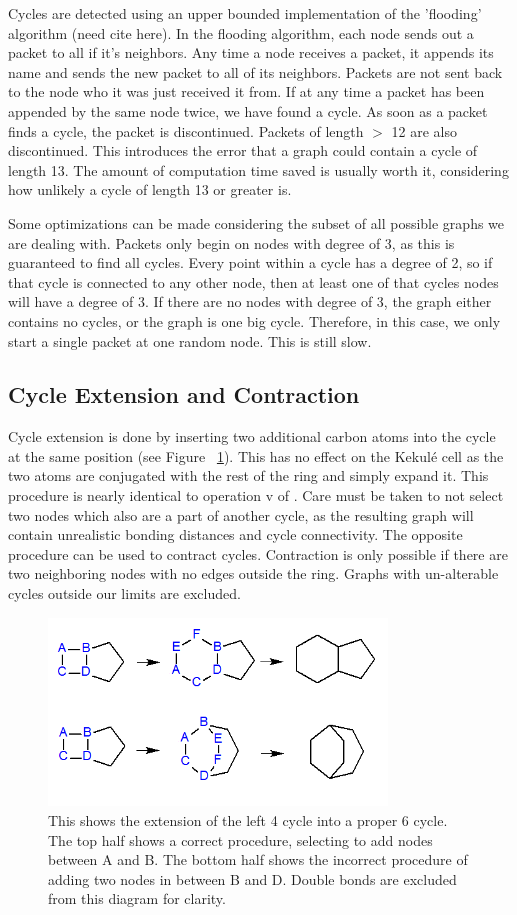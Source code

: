 \documentclass[12pt]{article}
\begin{document}
Cycles are detected using an upper bounded implementation of the 'flooding' algorithm (need cite here). In the flooding algorithm, each node sends out a packet to all if it's neighbors. Any time a node receives a packet, it appends its name and sends the new packet to all of its neighbors. Packets are not sent back to the node who it was just received it from. If at any time a packet has been appended by the same node twice, we have found a cycle. As soon as a packet finds a cycle, the packet is discontinued. Packets of length $>$ 12 are also discontinued. This introduces the error that a graph could contain a cycle of length 13. The amount of computation time saved is usually worth it, considering how unlikely a cycle of length 13 or greater is. 

Some optimizations can be made considering the subset of all possible graphs we are dealing with. Packets only begin on nodes with degree of 3, as this is guaranteed to find all cycles. Every point within a cycle has a degree of 2, so if that cycle is connected to any other node, then at least one of that cycles nodes will have a degree of 3. If there are no nodes with degree of 3, the graph either contains no cycles, or the graph is one big cycle. Therefore, in this case, we only start a single packet at one random node. This is still slow.

\subsection{Cycle Extension and Contraction}
Cycle extension is done by inserting two additional carbon atoms into the cycle at the same position (see Figure ~\ref{fig:cycleExtension}). This has no effect on the Kekul\'e cell as the two atoms are conjugated with the rest of the ring and simply expand it. This procedure is nearly identical to operation v of \cite{v06}. Care must be taken to not select two nodes which also are a part of another cycle, as the resulting graph will contain unrealistic bonding distances and cycle connectivity. The opposite procedure can be used to contract cycles. Contraction is only possible if there are two neighboring nodes with no edges outside the ring. Graphs with un-alterable cycles outside our limits are excluded.

\begin{figure}[ht!]
\centering
\includegraphics[width=90mm]{cycleExtension.png}
\caption{This shows the extension of the left 4 cycle into a proper 6 cycle. The top half shows a correct procedure, selecting to add nodes between A and B. The bottom half shows the incorrect procedure of adding two nodes in between B and D. Double bonds are excluded from this diagram for clarity.}
\label{fig:cycleExtension}
\end{figure}
\end{document}
